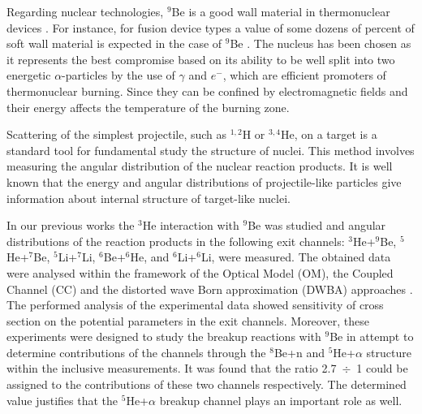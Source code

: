 \documentclass[10pt]{iopart}
\begin{document}
Regarding nuclear technologies, $^9$Be is a good wall material in thermonuclear devices \cite{kukulin2010, seksembayev2018}.
For instance, for fusion device types a value of some dozens of percent of soft wall material is expected in the case of $^9$Be \cite{seksembayev2018}.
The nucleus  has been chosen as it represents the best compromise based  on its ability to be well split into two energetic $\alpha$-particles by the use of $\gamma$ and $e^-$, which are efficient promoters of thermonuclear burning. Since they can be confined by electromagnetic fields and their energy affects the temperature of the burning zone.

	Scattering of the simplest projectile, such as $^{1,2}$H or $^{3,4}$He, on a target is a standard tool for fundamental study the structure of nuclei.
	This method involves measuring the angular distribution of the nuclear reaction products.
	It is well known that the energy and angular distributions of projectile-like particles give information about internal structure of target-like nuclei.
	
	In our previous works \cite{lukyanov2014, lukyanov2015, janseitov2018} the $^3$He interaction with $^9$Be was studied and angular distributions of the reaction products in the following exit channels: $^3$He+$^9$Be, $^5$He+$^7$Be, $^5$Li+$^7$Li, $^6$Be+$^6$He, and $^6$Li+$^6$Li, were measured. The obtained data were analysed within the framework of the Optical Model (OM), the Coupled Channel (CC) and the distorted wave Born approximation (DWBA) approaches  .
	The performed analysis of the experimental data showed  sensitivity of cross section on the potential parameters in the exit channels.
	Moreover, these experiments were designed to study the breakup reactions with $^9$Be in attempt to determine contributions of the channels through the $^8$Be+n  and  $^5$He+$\alpha$ structure within the inclusive measurements.
	It was found that the ratio 2.7~$\div$~1 could be assigned to the contributions of these two channels respectively. The determined value justifies that the $^5$He+$\alpha$ breakup channel plays an important role as well.
\end{document}
